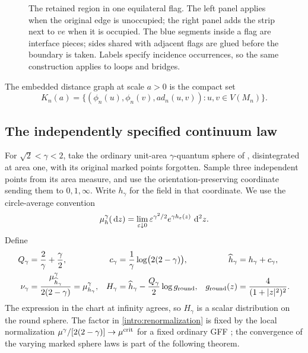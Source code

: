 \begin{figure}[htbp]
\centering

\caption{The retained region in one equilateral flag. The left panel applies when the original edge is unoccupied; the right panel adds the strip next to $ve$ when it is occupied. The blue segments inside a flag are interface pieces; sides shared with adjacent flags are glued before the boundary is taken. Labels specify incidence occurrences, so the same construction applies to loops and bridges.}
\label{fig:flags}
\end{figure}

The embedded distance graph at scale $a>0$ is the compact set
\begin{equation}\label{intro:distance-graph}
 K_n(a)=\{(\phi_n(u),\phi_n(v),a d_n(u,v)):
                  u,v\in V(M_n)\}.
\end{equation}

\subsection{The independently specified continuum law}

For $\sqrt2<\gamma<2$, take the ordinary unit-area $\gamma$-quantum sphere of \cite[Definition~4.21(ii)]{DMS}, disintegrated at area one, with its original marked points forgotten. Sample three independent points from its area measure, and use the orientation-preserving coordinate sending them to $0,1,\infty$. Write $h_\gamma$ for the field in that coordinate. We use the circle-average convention
\[
 \mu_h^\gamma(\,\mathrm d z)
  =\lim_{\varepsilon\downarrow0}
       \varepsilon^{\gamma^2/2}e^{\gamma h_\varepsilon(z)}\,\,\mathrm d^2z.
\]
Define
\begin{align}
 Q_\gamma&=\frac2\gamma+\frac\gamma2,
 &c_\gamma&=\frac1\gamma\log\bigl(2(2-\gamma)\bigr),
 &\widehat h_\gamma&=h_\gamma+c_\gamma,\label{intro:renormalization}\\
 \nu_\gamma&=\frac{\mu_{\widehat h_\gamma}^\gamma}{2(2-\gamma)}
             =\mu_{h_\gamma}^\gamma,
 &H_\gamma&=\widehat h_\gamma-
                \frac{Q_\gamma}{2}\log g_{\rm round},
 &g_{\rm round}(z)&=\frac4{(1+|z|^2)^2}.
 \label{intro:round-field}
\end{align}
The expression in the chart at infinity agrees, so $H_\gamma$ is a scalar distribution on the round sphere. The factor in \eqref{intro:renormalization} is fixed by the local normalization
$\mu^\gamma/[2(2-\gamma)]\to\mu^{\rm crit}$ for a fixed ordinary GFF \cite{APS}; the convergence of the varying marked sphere laws is part of the following theorem.

